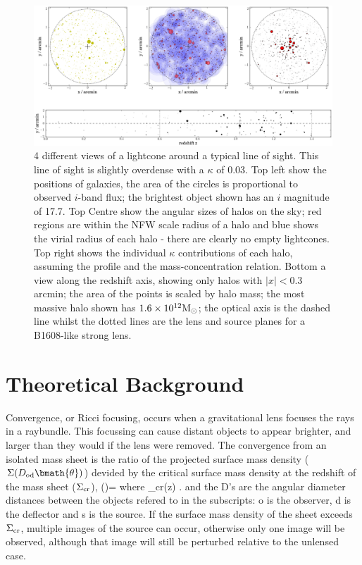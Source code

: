 \documentclass[useAMS,usenatbib]{mn2e}
\begin{document}
\begin{figure}
\includegraphics[width=\textwidth]{figs/viewofalightcone.eps}
\caption[magcut]{4 different views of a lightcone around a typical line of sight. This line of sight is slightly overdense with a $\kappa$ of 0.03. Top left show the positions of galaxies, the area of the circles is proportional to observed $i$-band flux; the brightest object shown has an $i$ magnitude of 17.7. Top Centre show the angular sizes of halos on the sky; red regions are within the NFW scale radius of a halo and blue shows the virial radius of each halo - there are clearly no empty lightcones. Top right shows the individual $\kappa$ contributions of each halo, assuming the \citet{BMO} profile and the \citet{Neto2007} mass-concentration relation. Bottom a view along the redshift axis, showing only halos with $|x|<0.3$ arcmin; the area of the points is scaled by halo mass; the most massive halo shown has $1.6\times10^{12}\Msun$; the optical axis is the dashed line whilst the dotted lines are the lens and source planes for a B1608-like strong lens.}
\label{fig:lightcone}
\end{figure}




\section{Theoretical Background}
\label{sec:theory}

Convergence, or Ricci focusing, occurs when a gravitational lens focuses the rays in a raybundle.
This focussing can cause distant objects to appear brighter, and larger than they would if the lens
 were removed.
The convergence from an isolated mass sheet is the ratio of the projected surface mass density
($\Sigma(D_{\mathrm{od}}\bmath{\theta})$) devided by the critical surface mass density at the redshift of the mass sheet ($\Sigma_{\rm cr}$),
\be
\kappa(\bmath{\theta})= 
\ee
where 
\be \label{eq:sigcrit} 
\Sigma_{\rm cr}(z) \equiv {}.
\ee
and the D's are the angular diameter distances between the objects refered to in the subscripts: o is the observer, d is the deflector and s is the source. If the surface mass density of the sheet exceeds $\Sigma_{\rm cr}$, multiple images of the source can
occur, otherwise only one image will be observed, although that image will still be perturbed
relative to the unlensed case.
\end{document}
